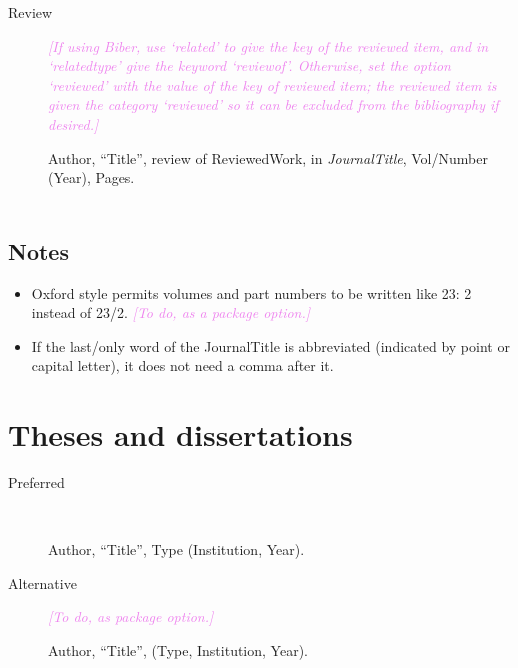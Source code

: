 \documentclass[extrafontsizes,11pt,a4paper,oneside]{memoir}
\newcommand*{\lit}[1]{\textsf{#1}}
\newcommand*{\code}[1]{`\textsf{#1}'}
\newcommand*{\aside}[1]{\textcolor{violet}{\emph{[#1]}}}
\begin{document}
\begin{description}
        \item[Review] \aside{If using Biber, use \code{related} to give the key of the reviewed item, and in \code{relatedtype} give the keyword \code{reviewof}. Otherwise, set the option \code{reviewed} with the value of the key of reviewed item; the reviewed item is given the category \code{reviewed} so it can be excluded from the bibliography if desired.}
        \par Author, \enquote{Title}, \lit{review of} ReviewedWork, \lit{in} \emph{JournalTitle}, Vol/Number (Year), Pages.
        \\
        \\
    \end{description}
    
    \subsection{Notes}
    
    \begin{itemize}
        \item Oxford style permits volumes and part numbers to be written like 23: 2 instead of 23/2. \aside{To do, as a package option.}
        
        \item If the last\slash only word of the JournalTitle is abbreviated (indicated by point or capital letter), it does not need a comma after it.
        \\
    \end{itemize}
    
    \section{Theses and dissertations}\label{sec:thesis}
    
    \begin{description}
        \item[Preferred]~\par Author, \enquote{Title}, Type (Institution, Year).
        \\
        
        \item[Alternative] \aside{To do, as package option.}\par Author, \enquote{Title}, (Type, Institution, Year).
    \end{description}
    
\end{document}
